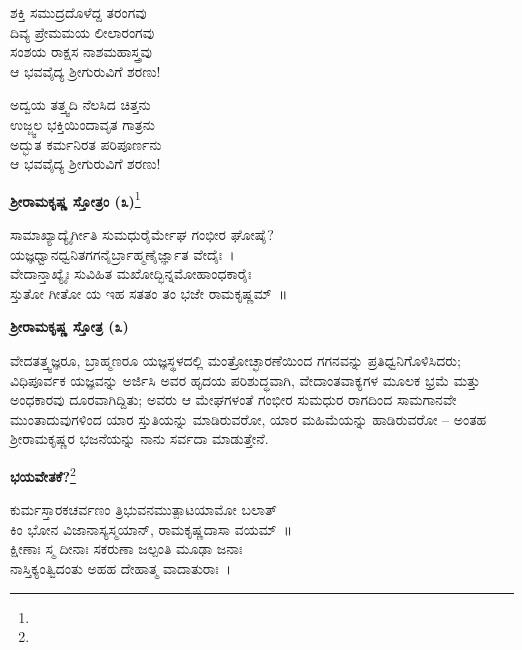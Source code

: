 \begin{myquote}
ಶಕ್ತಿ ಸಮುದ್ರದೊಳೆದ್ದ ತರಂಗವು\\ದಿವ್ಯ ಪ್ರೇಮಮಯ ಲೀಲಾರಂಗವು\\ಸಂಶಯ ರಾಕ್ಷಸ ನಾಶಮಹಾಸ್ತ್ರವು\\ಆ ಭವವೈದ್ಯ ಶ‍್ರೀಗುರುವಿಗೆ ಶರಣು!
\end{myquote}

\begin{myquote}
ಅದ್ವಯ ತತ್ತ್ವದಿ ನೆಲಸಿದ ಚಿತ್ತನು\\ಉಜ್ಜ್ವಲ ಭಕ್ತಿಯಿಂದಾವೃತ ಗಾತ್ರನು\\ಅದ್ಭುತ ಕರ್ಮನಿರತ ಪರಿಪೂರ್ಣನು\\ಆ ಭವವೈದ್ಯ ಶ‍್ರೀಗುರುವಿಗೆ ಶರಣು!
\end{myquote}

\begin{center}
\textbf{ಶ‍್ರೀರಾಮಕೃಷ್ಣ ಸ್ತೋತ್ರಂ (೩)}\footnote{}
\end{center}

\begin{myquote}
ಸಾಮಾಖ್ಯಾದ್ಯೈರ್ಗೀತಿ ಸುಮಧುರೈರ್ಮೇಘ ಗಂಭೀರ ಘೋಷೈ?\\ಯಜ್ಞಧ್ವಾನಧ್ವನಿತಗಗನೈರ್ಬ್ರಾಹ್ಮಣೈರ್ಜ್ಞಾತ ವೇದೈಃ~।\\ವೇದಾನ್ತಾಖ್ಯೈಃ ಸುವಿಹಿತ ಮಖೋದ್ಭಿನ್ನಮೋಹಾಂಧಕಾರೈಃ\\ಸ್ತುತೋ ಗೀತೋ ಯ ಇಹ ಸತತಂ ತಂ ಭಜೇ ರಾಮಕೃಷ್ಣಮ್~॥
\end{myquote}

\begin{center}
\textbf{ಶ‍್ರೀರಾಮಕೃಷ್ಣ ಸ್ತೋತ್ರ (೩)}
\end{center}

ವೇದತತ್ತ್ವಜ್ಞರೂ, ಬ್ರಾಹ್ಮಣರೂ ಯಜ್ಞಸ್ಥಳದಲ್ಲಿ ಮಂತ್ರೋಚ್ಛಾರಣೆಯಿಂದ ಗಗನವನ್ನು ಪ್ರತಿಧ್ವನಿಗೊಳಿಸಿದರು; ವಿಧಿಪೂರ್ವಕ ಯಜ್ಞವನ್ನು ಅರ್ಜಿಸಿ ಅವರ ಹೃದಯ ಪರಿಶುದ್ಧವಾಗಿ, ವೇದಾಂತವಾಕ್ಯಗಳ ಮೂಲಕ ಭ್ರಮೆ ಮತ್ತು ಅಂಧಕಾರವು ದೂರವಾಗಿದ್ದಿತು; ಅವರು ಆ ಮೇಘಗಳಂತೆ ಗಂಭೀರ ಸುಮಧುರ ರಾಗದಿಂದ ಸಾಮಗಾನವೇ ಮುಂತಾದುವುಗಳಿಂದ ಯಾರ ಸ್ತುತಿಯನ್ನು ಮಾಡಿರುವರೋ, ಯಾರ ಮಹಿಮೆಯನ್ನು ಹಾಡಿರುವರೋ – ಅಂತಹ ಶ‍್ರೀರಾಮಕೃಷ್ಣರ ಭಜನೆಯನ್ನು ನಾನು ಸರ್ವದಾ ಮಾಡುತ್ತೇನೆ.

\begin{center}
\textbf{ಭಯವೇತಕೆ?}\footnote{}
\end{center}

\begin{myquote}
ಕುರ್ಮಸ್ತಾರಕಚರ್ವಣಂ ತ್ರಿಭುವನಮುತ್ಪಾಟಯಾಮೋ ಬಲಾತ್\\ಕಿಂ ಭೋನ ವಿಜಾನಾಸ್ಯಸ್ಮಯಾನ್, ರಾಮಕೃಷ್ಣದಾಸಾ ವಯಮ್~॥\\ಕ್ಷೀಣಾಃ ಸ್ಮ ದೀನಾಃ ಸಕರುಣಾ ಜಲ್ಪಂತಿ ಮೂಢಾ ಜನಾಃ\\ನಾಸ್ತಿಕ್ಯಂತ್ವಿದಂತು ಅಹಹ ದೇಹಾತ್ಮ ವಾದಾತುರಾಃ~।
\end{myquote}

